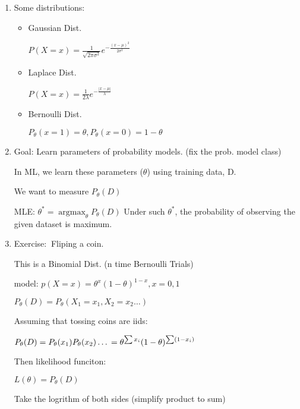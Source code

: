 \documentclass[12pt]{article}
\newcommand{\exe}{{\color{green} Exercise: $\ $}}
\DeclareMathOperator*{\argmax}{\arg\max}
\begin{document}
        \begin{enumerate}            
            \item Some distributions:
            \begin{itemize}
                \item Gaussian Dist.
                
                $P(X=x) = \frac{1}{\sqrt{2\pi \sigma^2}}e^{-\frac{(x-\mu)^2}{2\sigma^2}}$
                \item Laplace Dist.
                
                $P(X = x) = \frac{1}{2\lambda}e^{-\frac{|x-\mu|}{\lambda}}$

                \item Bernoulli Dist.
                
                $P_\theta(x = 1) = \theta, P_\theta(x = 0) = 1 -\theta$
            \end{itemize}

            \item Goal: Learn parameters of probability models. (fix the prob. model class)
            
            In ML, we learn these parameters ($\theta$) using training data, D.

            We want to measure $P_\theta(D)$

            MLE: $\theta^* = \argmax_{\theta}P_\theta(D)$ Under such $\theta^*$, the probability of observing the given dataset is maximum.

            \item \exe Fliping a coin.
            
            This is a Binomial Dist. (n time Bernoulli Trials)
            
            model: $p(X = x) = \theta^{x}(1-\theta)^{1-x}, x = 0, 1$

            $P_\theta(D) = P_\theta(X_1 = x_1, X_2 = x_2 \dots)$

            Assuming that tossing coins are iids:

            $P_\theta(D) = P_\theta(x_1)P_\theta(x_2) \dots\\
            = \theta^{\sum x_i} (1-\theta)^{\sum (1-x_i)}$

            Then likelihood funciton: 

            $L(\theta) = P_\theta(D)$

            Take the logrithm of both sides (simplify product to sum)


\end{enumerate}
\end{document}
